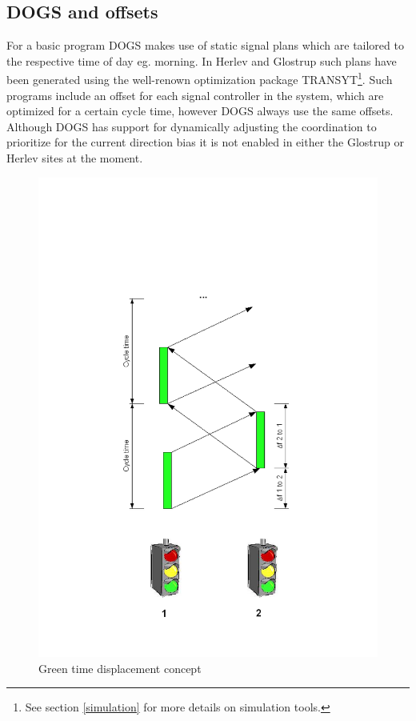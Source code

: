 \subsection{DOGS and offsets}
\label{dogs_offset}

For a basic program DOGS makes use of static signal plans which are tailored to the respective time of day eg. morning. In Herlev and Glostrup such plans have been generated using the well-renown optimization package TRANSYT\footnote{See section \ref{simulation} for more details on simulation	tools.}. Such programs include an offset for each signal controller in the system, which are optimized for a certain cycle time, however DOGS always use the same offsets. Although DOGS has support for dynamically adjusting the coordination to prioritize for the current direction bias it is not enabled in either the Glostrup or Herlev sites at the moment.

\begin{figure}[htb]
\centering
\includegraphics[scale=0.5]{green_time_displacement_and_cycle_time.png} 
\caption{Green time displacement concept}
\label{fig:green_time_displacement_concept}
\end{figure}

